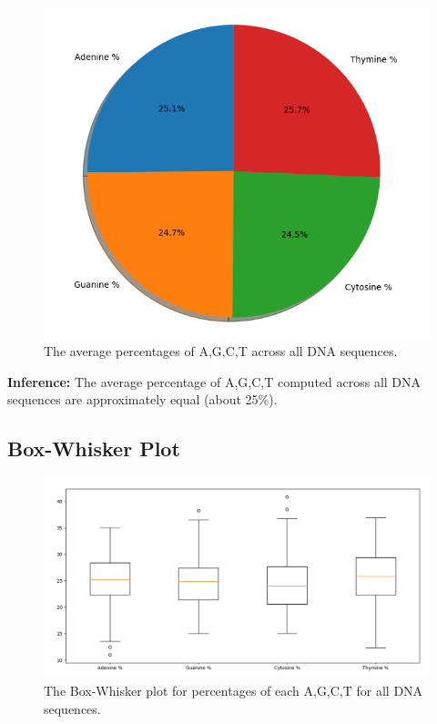 \documentclass{article}
\begin{document}
			\begin{figure}[!htbp]
				\centering
				\includegraphics[scale=0.5]{charts/Figure_1}
				\caption{The average percentages of A,G,C,T across all DNA sequences.}
			\end{figure}
			
			\textbf{Inference:} The average percentage of A,G,C,T computed across all DNA sequences are approximately equal (about 25\%).
		
		\subsection{Box-Whisker Plot}
			
			\begin{figure}[!htbp]
				\centering
				\includegraphics[scale=0.5]{charts/Figure_2}
				\caption{The Box-Whisker plot for percentages of each A,G,C,T for all DNA sequences.}
			\end{figure}
			
\end{document}
